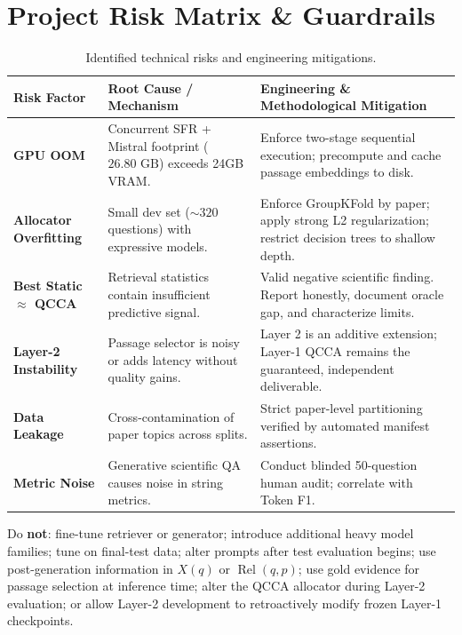 \documentclass[11pt,a4paper]{article}
\begin{document}
\section{Project Risk Matrix \& Guardrails}
\begin{table}[H]
\centering
\small
\begin{tabularx}{\textwidth}{l>{\raggedright\arraybackslash}p{5.2cm}>{\raggedright\arraybackslash}X}
\toprule
\textbf{Risk Factor} & \textbf{Root Cause / Mechanism} & \textbf{Engineering \& Methodological Mitigation} \\
\midrule
\textbf{GPU OOM} & Concurrent SFR + Mistral footprint ($26.80\text{ GB}$) exceeds 24GB VRAM. & Enforce two-stage sequential execution; precompute and cache passage embeddings to disk. \\
\addlinespace[2pt]
\textbf{Allocator Overfitting} & Small dev set ($\sim 320$ questions) with expressive models. & Enforce GroupKFold by paper; apply strong L2 regularization; restrict decision trees to shallow depth. \\
\addlinespace[2pt]
\textbf{Best Static $\approx$ QCCA} & Retrieval statistics contain insufficient predictive signal. & Valid negative scientific finding. Report honestly, document oracle gap, and characterize limits. \\
\addlinespace[2pt]
\textbf{Layer-2 Instability} & Passage selector is noisy or adds latency without quality gains. & Layer 2 is an additive extension; Layer-1 QCCA remains the guaranteed, independent deliverable. \\
\addlinespace[2pt]
\textbf{Data Leakage} & Cross-contamination of paper topics across splits. & Strict paper-level partitioning verified by automated manifest assertions. \\
\addlinespace[2pt]
\textbf{Metric Noise} & Generative scientific QA causes noise in string metrics. & Conduct blinded 50-question human audit; correlate with Token F1. \\
\bottomrule
\end{tabularx}
\caption{Identified technical risks and engineering mitigations.}
\end{table}

\begin{warningbox}
Do \textbf{not}: fine-tune retriever or generator; introduce additional heavy model families; tune on final-test data; alter prompts after test evaluation begins; use post-generation information in $X(q)$ or $\operatorname{Rel}(q, p)$; use gold evidence for passage selection at inference time; alter the QCCA allocator during Layer-2 evaluation; or allow Layer-2 development to retroactively modify frozen Layer-1 checkpoints.
\end{warningbox}
\end{document}

